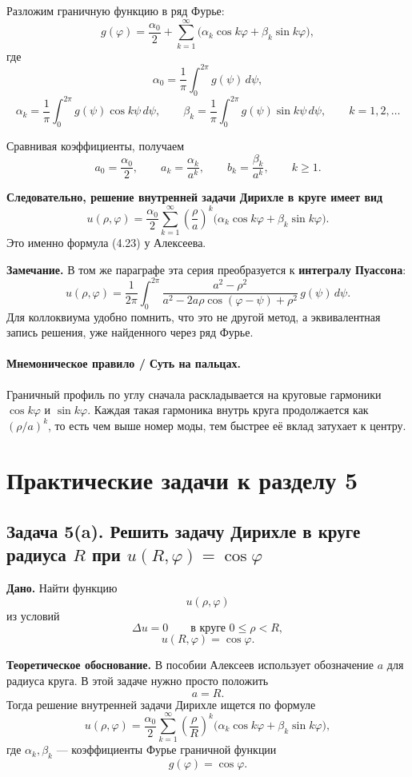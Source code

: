 \documentclass[a4paper,12pt]{article}
\begin{document}
Разложим граничную функцию в ряд Фурье:
\[
g(\varphi)=\frac{\alpha_0}{2}+
\sum_{k=1}^{\infty}
\bigl(\alpha_k\cos k\varphi+\beta_k\sin k\varphi\bigr),
\]
где
\[
\alpha_0=\frac{1}{\pi}\int_0^{2\pi}g(\psi)\,d\psi,
\]
\[
\alpha_k=\frac{1}{\pi}\int_0^{2\pi}g(\psi)\cos k\psi\,d\psi,
\qquad
\beta_k=\frac{1}{\pi}\int_0^{2\pi}g(\psi)\sin k\psi\,d\psi,
\qquad
k=1,2,\dots
\]

Сравнивая коэффициенты, получаем
\[
a_0=\frac{\alpha_0}{2},
\qquad
a_k=\frac{\alpha_k}{a^k},
\qquad
b_k=\frac{\beta_k}{a^k},
\qquad
k\ge 1.
\]

\textbf{Следовательно, решение внутренней задачи Дирихле в круге имеет вид}
\[
u(\rho,\varphi)
=
\frac{\alpha_0}{2}
\sum_{k=1}^{\infty}
\left(\frac{\rho}{a}\right)^k
\bigl(\alpha_k\cos k\varphi+\beta_k\sin k\varphi\bigr).
\]
Это именно формула (4.23) у Алексеева.

\textbf{Замечание.}
В том же параграфе эта серия преобразуется к \textbf{интегралу Пуассона}:
\[
u(\rho,\varphi)
=
\frac{1}{2\pi}\int_0^{2\pi}
\frac{a^2-\rho^2}{a^2-2a\rho\cos(\varphi-\psi)+\rho^2}\,
g(\psi)\,d\psi.
\]
Для коллоквиума удобно помнить, что это не другой метод, а эквивалентная запись решения, уже найденного через ряд Фурье.

\paragraph{Мнемоническое правило / Суть на пальцах.}
Граничный профиль по углу сначала раскладывается на круговые гармоники \(\cos k\varphi\) и \(\sin k\varphi\). Каждая такая гармоника внутрь круга продолжается как \((\rho/a)^k\), то есть чем выше номер моды, тем быстрее её вклад затухает к центру.

\section*{Практические задачи к разделу 5}

\subsection*{Задача 5(a). Решить задачу Дирихле в круге радиуса \texorpdfstring{$R$}{R} при \texorpdfstring{$u(R,\varphi)=\cos\varphi$}{u(R,phi)=cos phi}}

\textbf{Дано.}
Найти функцию
\[
u(\rho,\varphi)
\]
из условий
\[
\Delta u=0
\qquad \text{в круге } 0\le \rho<R,
\]
\[
u(R,\varphi)=\cos\varphi.
\]

\textbf{Теоретическое обоснование.}
В пособии Алексеев использует обозначение $a$ для радиуса круга. В этой задаче нужно просто положить
\[
a=R.
\]
Тогда решение внутренней задачи Дирихле ищется по формуле
\[
u(\rho,\varphi)
=
\frac{\alpha_0}{2}
\sum_{k=1}^{\infty}
\left(\frac{\rho}{R}\right)^k
\bigl(\alpha_k\cos k\varphi+\beta_k\sin k\varphi\bigr),
\]
где $\alpha_k,\beta_k$ --- коэффициенты Фурье граничной функции
\[
g(\varphi)=\cos\varphi.
\]
\end{document}
